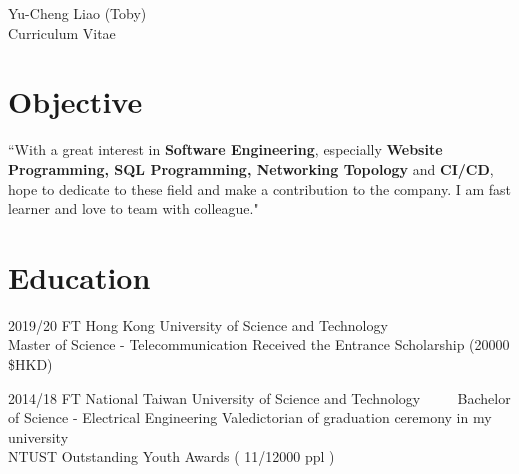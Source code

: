 \documentclass[10pt]{article} %
\begin{document}
\begin{paracol}{2} %


\parbox[top][0.12\textheight][c]{\linewidth}{ 
	\vspace{-0.04\textheight} %
	\centering %
	{\sffamily\Huge Yu-Cheng Liao (Toby)}\\\medskip %
	{\Huge\color{headings} Curriculum Vitae}
}


\section{Objective}  %
{\raggedright{``With a great interest in \textbf{Software Engineering}, especially \textbf{Website Programming, SQL Programming, Networking Topology} and \textbf{CI/CD}, hope to dedicate to these field and make a contribution to the company. I am fast learner and love to team with colleague."}\\\medskip}

\section{Education}
\begin{flushleft}  %

	\workposition
		{2019/20}
		{FT}
		{Hong Kong University of Science and Technology \ \ \ \ \ \ \ \ \ \ \ \ \  } 
		{Master of Science - Telecommunication}
		{Received the Entrance Scholarship (20000 \$HKD)}
	
	\workposition
		{2014/18}
		{FT}
		{National Taiwan University of Science and Technology  \ \ \ \ } 
		{Bachelor of Science - Electrical Engineering}
		{Valedictorian of graduation ceremony in my university\\
		  NTUST Outstanding Youth Awards ( 11/12000 ppl )}
	

\end{flushleft}
\end{paracol}
\end{document}
